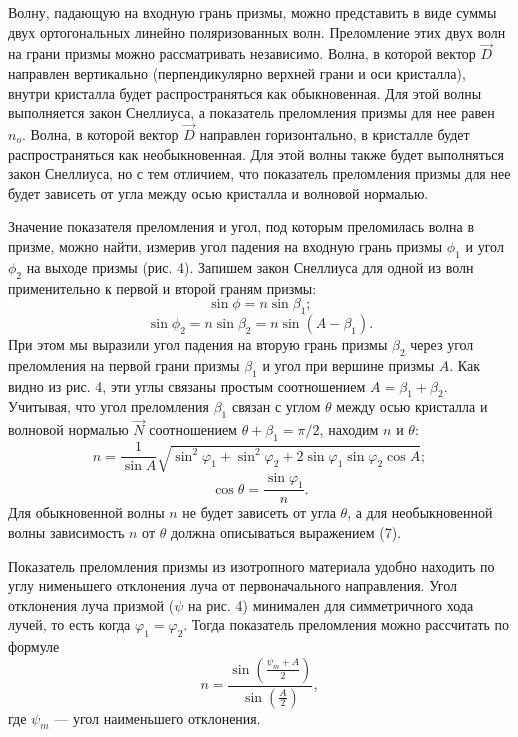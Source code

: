 \documentclass[10pt, a4paper]{article}
\begin{document}
Волну, падающую на входную грань призмы, можно представить в виде суммы двух ортогональных линейно поляризованных волн. Преломление этих двух волн на грани призмы можно рассматривать независимо. Волна, в которой вектор $\vec D$ направлен вертикально (перпендикулярно верхней грани и оси кристалла), внутри кристалла будет распространяться как обыкновенная. Для этой волны выполняется закон Снеллиуса, а показатель преломления призмы для нее равен $n_o$. Волна, в которой вектор $\vec D$ направлен горизонтально, в кристалле будет распространяться как необыкновенная. Для этой волны также будет выполняться закон Снеллиуса, но с тем отличием, что показатель преломления призмы для нее будет зависеть от угла между осью кристалла и волновой нормалью. 

Значение показателя преломления и угол, под которым преломилась волна в призме, можно найти, измерив угол падения на входную грань призмы $\phi_1$ и угол $\phi_2$ на выходе призмы (рис. 4). Запишем закон Снеллиуса для одной из волн применительно к первой и второй граням призмы:
\[
	\sin \phi = n \sin \beta_1;
\]
\[
	\sin \phi_2 = n \sin \beta_2 = n \sin (A - \beta_1).
\]
При этом мы выразили угол падения на вторую грань призмы $\beta_2$ через угол преломления на первой грани призмы $\beta_1$ и угол при вершине призмы $A$. Как видно из рис. 4, эти углы связаны простым соотношением $A = \beta_1 + \beta_2$. Учитывая, что угол преломления $\beta_1$ связан с углом $\theta$ между осью кристалла и волновой нормалью $\vec N$ соотношением $\theta + \beta_1 = \pi / 2$, находим $n$ и $\theta$:
\begin{equation}
n = \frac{1}{\sin A} \sqrt{\sin^2 \varphi_1 + \sin^2 \varphi_2 + 2 \sin \varphi_1 \sin \varphi_2 \cos A};
\end{equation}
\[
	\cos \theta = \frac{\sin \varphi_1}{n}.
\]
Для обыкновенной волны $n$ не будет зависеть от угла $\theta$, а для необыкновенной волны зависимость $n$ от $\theta$ должна описываться выражением (7).

Показатель преломления призмы из изотропного материала удобно находить по углу нименьшего отклонения луча от первоначального направления. Угол отклонения луча призмой ($\psi$ на рис. 4) минимален для симметричного хода лучей, то есть когда $\varphi_1 = \varphi_2$. Тогда показатель преломления можно рассчитать по формуле
\begin{equation}
n=\frac{\sin \left(\frac{\psi_{m}+A}{2}\right)}{\sin \left(\frac{A}{2}\right)},
\end{equation}
где $\psi_m$ --- угол наименьшего отклонения.
\end{document}
